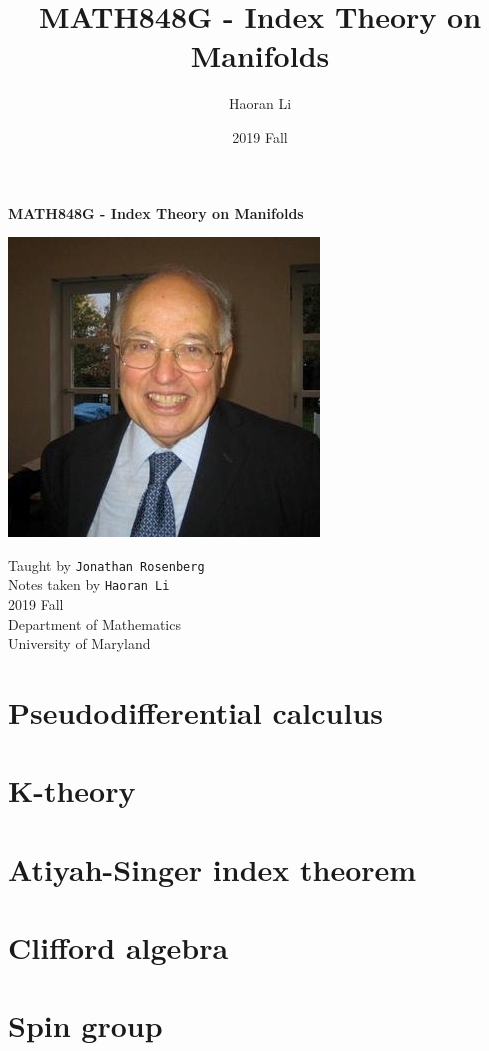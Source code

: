\documentclass[a4paper,10pt]{article}
\title{MATH848G - Index Theory on Manifolds}
\author{Haoran Li}
\date{2019 Fall}
\begin{document}
\sloppy %

\begin{titlepage}
\begin{center}
\vspace*{1cm}
\LARGE
\textbf{MATH848G - Index Theory on Manifolds} \\
\vspace{2cm}
\begin{center}
\includegraphics{Pictures/Michael_Francis_Atiyah.jpg}
\end{center}
\vspace{2cm}
\normalsize
Taught by \texttt{Jonathan Rosenberg} \\
Notes taken by \texttt{Haoran Li} \\
2019 Fall \\
\vspace{2cm}
Department of Mathematics\\
University of Maryland\\
\end{center}
\end{titlepage}

\tableofcontents
\newpage

\section{Pseudodifferential calculus}

\newpage

\section{K-theory}

\newpage

\section{Atiyah-Singer index theorem}

\newpage

\section{Clifford algebra}

\newpage

\section{Spin group}

\newpage

\begin{thebibliography}{}



\end{thebibliography}

\printindex
\newpage
\end{document}
